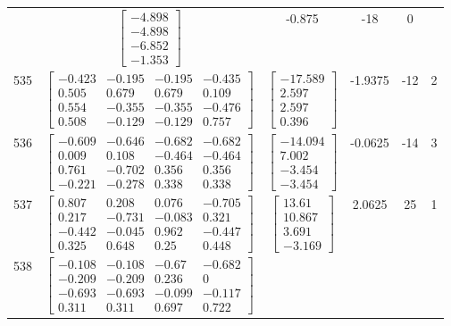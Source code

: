 \documentclass[a4paper,12pt]{article}
\begin{document}
\begin{tabular}{c c c c c c}
&
$\begin{bmatrix} -4.898 \\ -4.898 \\ -6.852 \\ -1.353 \end{bmatrix}$
&
-0.875
&
-18
&
0
\\
535
&
$\begin{bmatrix} -0.423 & -0.195 & -0.195 & -0.435 \\ 0.505 & 0.679 & 0.679 & 0.109 \\ 0.554 & -0.355 & -0.355 & -0.476 \\ 0.508 & -0.129 & -0.129 & 0.757 \end{bmatrix}$
&
$\begin{bmatrix} -17.589 \\ 2.597 \\ 2.597 \\ 0.396 \end{bmatrix}$
&
-1.9375
&
-12
&
2
\\
536
&
$\begin{bmatrix} -0.609 & -0.646 & -0.682 & -0.682 \\ 0.009 & 0.108 & -0.464 & -0.464 \\ 0.761 & -0.702 & 0.356 & 0.356 \\ -0.221 & -0.278 & 0.338 & 0.338 \end{bmatrix}$
&
$\begin{bmatrix} -14.094 \\ 7.002 \\ -3.454 \\ -3.454 \end{bmatrix}$
&
-0.0625
&
-14
&
3
\\
537
&
$\begin{bmatrix} 0.807 & 0.208 & 0.076 & -0.705 \\ 0.217 & -0.731 & -0.083 & 0.321 \\ -0.442 & -0.045 & 0.962 & -0.447 \\ 0.325 & 0.648 & 0.25 & 0.448 \end{bmatrix}$
&
$\begin{bmatrix} 13.61 \\ 10.867 \\ 3.691 \\ -3.169 \end{bmatrix}$
&
2.0625
&
25
&
1
\\
538
&
$\begin{bmatrix} -0.108 & -0.108 & -0.67 & -0.682 \\ -0.209 & -0.209 & 0.236 & 0 \\ -0.693 & -0.693 & -0.099 & -0.117 \\ 0.311 & 0.311 & 0.697 & 0.722 \end{bmatrix}$

\end{tabular}
\end{document}
